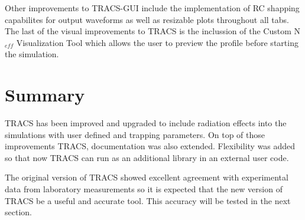 Other improvements to TRACS-GUI include the implementation of RC shapping capabilites for output waveforms as well as resizable plots throughout all tabs. The last of the visual improvements to TRACS is the inclussion of the Custom N$_{eff}$ Visualization Tool which allows the user to preview the \neff profile before starting the simulation.

\section{Summary}

TRACS has been improved and upgraded to include radiation effects into the simulations with user defined \neff and trapping parameters. On top of those improvements TRACS, documentation was also extended. Flexibility was added so that now TRACS can run as an additional library in an external user code.

The original version of TRACS showed excellent agreement with experimental data from laboratory measurements so it is expected that the new version of TRACS be a useful and accurate tool. This accuracy will be tested in the next section.%

